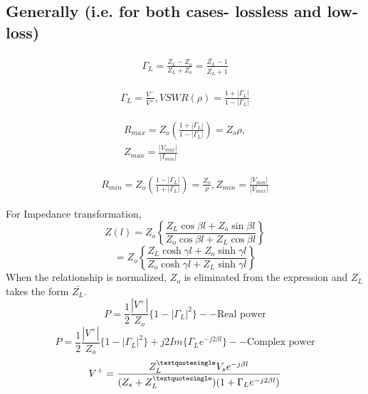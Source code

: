 \subsection*{Generally (i.e. for both cases- lossless and low-loss)}

\begin{align*}
\Gamma_L = \frac{Z_L - Z_o}{Z_L + Z_o} = \frac{\bar{Z_L} - 1}{\bar{Z_L} + 1}
\end{align*}

\begin{align*}
\Gamma_L = \frac{V^-}{V^+},
VSWR(\rho) = \frac{1 + |\Gamma_L|}{1 - |\Gamma_L|}
\end{align*}

\begin{align*}
R_{max} = Z_o \left( \frac{1 + |\Gamma_L|}{1 - |\Gamma_L|}\right) = Z_o \rho,\\
Z_{max} = \frac{|V_{max}|}{|I_{min}|}
\end{align*}

\begin{align*}
R_{min} = Z_o \left(\frac{1 - |\Gamma_L|}{1 + |\Gamma_L|}\right) = \frac{Z_o}{\rho}, Z_{min} = \frac{|V_{min}|}{|V_{max}|}
\end{align*}

For Impedance transformation, 
$$Z(l) = Z_o\left\{\frac{Z_L\cos\beta l + Z_o\sin\beta l}{Z_o\cos\beta l + Z_L\cos\beta l}\right\} $$
$$= Z_o\left\{\frac{Z_L\cosh\gamma l + Z_o\sinh\gamma l}{Z_o\cosh\gamma l + Z_L\sinh\gamma l}\right\}	$$
When the relationship is normalized, $Z_o$ is eliminated from the expression and $Z_L$ takes the form $\bar{Z_L}$.
$$P = \frac{1}{2}\frac{|V^+|}{Z_o}\lbrace 1 - |\Gamma_L|^2\rbrace --\text{Real power}	$$
$$P = \frac{1}{2}\frac{|V^+|}{Z_o}\lbrace 1 - |\Gamma_L|^2\rbrace + j2Im\lbrace \Gamma_L e^{- j2\beta l}\rbrace --\text{Complex power}$$
$$V^+ = \dfrac{Z_L^{\textquotesingle}V_s e^{-j\beta l}}{(Z_s + Z_L^{\textquotesingle})(1 + \Gamma_L e^{-j2\beta
l})}$$
